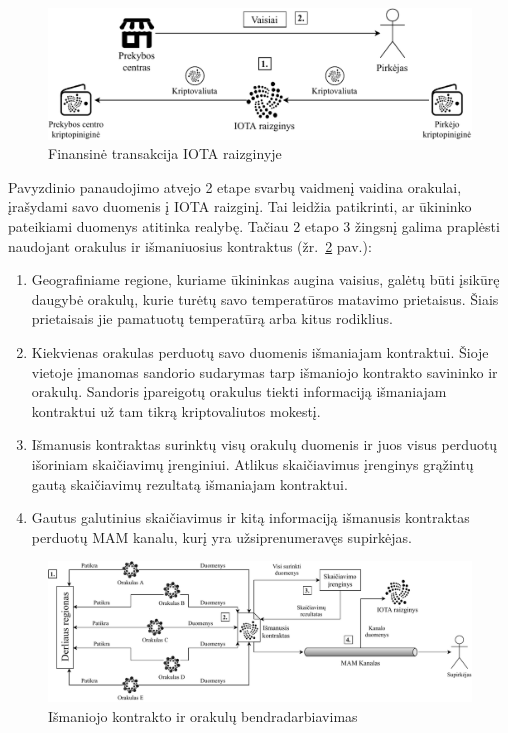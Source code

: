 \begin{figure}[H]
    \centering
    \includegraphics[scale=0.75]{images/tangle-financial-transaction}
    \caption{Finansinė transakcija IOTA raizginyje}
    \label{img:21}
\end{figure}

Pavyzdinio panaudojimo atvejo 2 etape svarbų vaidmenį vaidina orakulai, įrašydami savo duomenis į IOTA raizginį. Tai leidžia patikrinti, ar ūkininko pateikiami duomenys atitinka realybę. Tačiau 2 etapo 3 žingsnį galima praplėsti naudojant orakulus ir išmaniuosius kontraktus (žr.~\ref{img:22} pav.): 
\begin{enumerate}
    \item Geografiniame regione, kuriame ūkininkas augina vaisius, galėtų būti įsikūrę daugybė orakulų, kurie turėtų savo temperatūros matavimo prietaisus. Šiais prietaisais jie pamatuotų temperatūrą arba kitus rodiklius.
    \item Kiekvienas orakulas perduotų savo duomenis išmaniajam kontraktui. Šioje vietoje įmanomas sandorio sudarymas tarp išmaniojo kontrakto savininko ir orakulų. Sandoris įpareigotų orakulus tiekti informaciją išmaniajam kontraktui už tam tikrą kriptovaliutos mokestį.
    \item Išmanusis kontraktas surinktų visų orakulų duomenis ir juos visus perduotų išoriniam skaičiavimų įrenginiui. Atlikus skaičiavimus įrenginys grąžintų gautą skaičiavimų rezultatą išmaniajam kontraktui.
    \item Gautus galutinius skaičiavimus ir kitą informaciją išmanusis kontraktas perduotų MAM kanalu, kurį yra užsiprenumeravęs supirkėjas.
\end{enumerate}

\begin{figure}[H]
    \centering
    \includegraphics[scale=0.63]{images/tangle-smart-contract}
    \caption{Išmaniojo kontrakto ir orakulų bendradarbiavimas}
    \label{img:22}
\end{figure}



